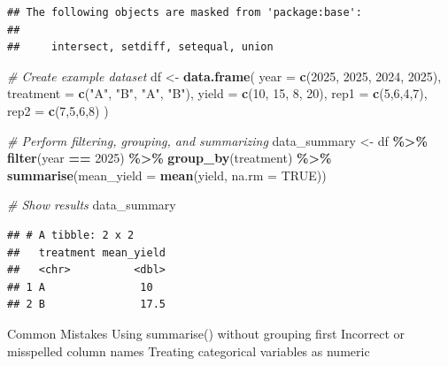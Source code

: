 \documentclass[
]{article}
\newenvironment{Shaded}{\begin{snugshade}}{\end{snugshade}}
\newcommand{\AttributeTok}[1]{\textcolor[rgb]{0.13,0.29,0.53}{#1}}
\newcommand{\CommentTok}[1]{\textcolor[rgb]{0.56,0.35,0.01}{\textit{#1}}}
\newcommand{\ConstantTok}[1]{\textcolor[rgb]{0.56,0.35,0.01}{#1}}
\newcommand{\DecValTok}[1]{\textcolor[rgb]{0.00,0.00,0.81}{#1}}
\newcommand{\FunctionTok}[1]{\textcolor[rgb]{0.13,0.29,0.53}{\textbf{#1}}}
\newcommand{\NormalTok}[1]{#1}
\newcommand{\OtherTok}[1]{\textcolor[rgb]{0.56,0.35,0.01}{#1}}
\newcommand{\SpecialCharTok}[1]{\textcolor[rgb]{0.81,0.36,0.00}{\textbf{#1}}}
\newcommand{\StringTok}[1]{\textcolor[rgb]{0.31,0.60,0.02}{#1}}
\begin{document}
\begin{verbatim}
## The following objects are masked from 'package:base':
## 
##     intersect, setdiff, setequal, union
\end{verbatim}

\begin{Shaded}
\begin{Highlighting}[]
\CommentTok{\# Create example dataset}
\NormalTok{df }\OtherTok{\textless{}{-}} \FunctionTok{data.frame}\NormalTok{(}
  \AttributeTok{year =} \FunctionTok{c}\NormalTok{(}\DecValTok{2025}\NormalTok{, }\DecValTok{2025}\NormalTok{, }\DecValTok{2024}\NormalTok{, }\DecValTok{2025}\NormalTok{),}
  \AttributeTok{treatment =} \FunctionTok{c}\NormalTok{(}\StringTok{"A"}\NormalTok{, }\StringTok{"B"}\NormalTok{, }\StringTok{"A"}\NormalTok{, }\StringTok{"B"}\NormalTok{),}
  \AttributeTok{yield =} \FunctionTok{c}\NormalTok{(}\DecValTok{10}\NormalTok{, }\DecValTok{15}\NormalTok{, }\DecValTok{8}\NormalTok{, }\DecValTok{20}\NormalTok{),}
  \AttributeTok{rep1 =} \FunctionTok{c}\NormalTok{(}\DecValTok{5}\NormalTok{,}\DecValTok{6}\NormalTok{,}\DecValTok{4}\NormalTok{,}\DecValTok{7}\NormalTok{),}
  \AttributeTok{rep2 =} \FunctionTok{c}\NormalTok{(}\DecValTok{7}\NormalTok{,}\DecValTok{5}\NormalTok{,}\DecValTok{6}\NormalTok{,}\DecValTok{8}\NormalTok{)}
\NormalTok{)}

\CommentTok{\# Perform filtering, grouping, and summarizing}
\NormalTok{data\_summary }\OtherTok{\textless{}{-}}\NormalTok{ df }\SpecialCharTok{\%\textgreater{}\%}
  \FunctionTok{filter}\NormalTok{(year }\SpecialCharTok{==} \DecValTok{2025}\NormalTok{) }\SpecialCharTok{\%\textgreater{}\%}
  \FunctionTok{group\_by}\NormalTok{(treatment) }\SpecialCharTok{\%\textgreater{}\%}
  \FunctionTok{summarise}\NormalTok{(}\AttributeTok{mean\_yield =} \FunctionTok{mean}\NormalTok{(yield, }\AttributeTok{na.rm =} \ConstantTok{TRUE}\NormalTok{))}

\CommentTok{\# Show results}
\NormalTok{data\_summary}
\end{Highlighting}
\end{Shaded}

\begin{verbatim}
## # A tibble: 2 x 2
##   treatment mean_yield
##   <chr>          <dbl>
## 1 A               10  
## 2 B               17.5
\end{verbatim}

Common Mistakes Using summarise() without grouping first Incorrect or
misspelled column names Treating categorical variables as numeric
\end{document}
